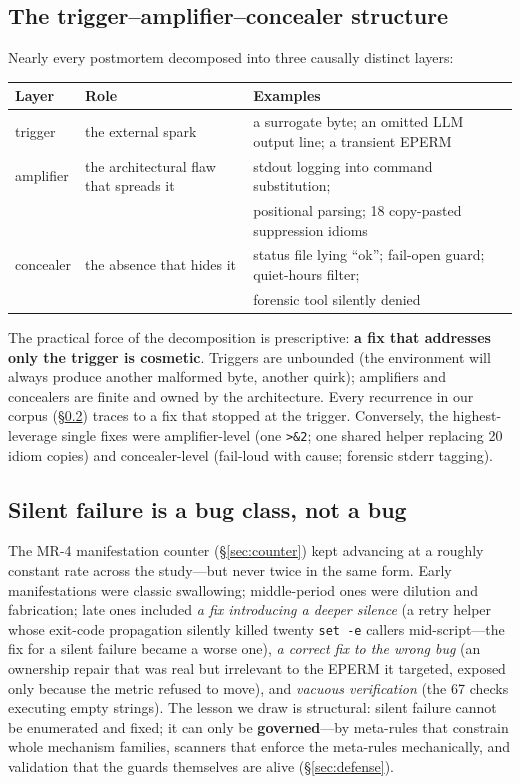 \subsection{The trigger--amplifier--concealer structure}\label{sec:tac}

Nearly every postmortem decomposed into three causally distinct layers:

\begin{center}\small
\begin{tabular}{@{}lll@{}}
\toprule
\textbf{Layer} & \textbf{Role} & \textbf{Examples} \\
\midrule
trigger & the external spark & a surrogate byte; an omitted LLM output
line; a transient EPERM \\
amplifier & the architectural flaw that spreads it & stdout logging into
command substitution; \\
& & positional parsing; 18 copy-pasted suppression idioms \\
concealer & the absence that hides it & status file lying ``ok'';
fail-open guard; quiet-hours filter; \\
& & forensic tool silently denied \\
\bottomrule
\end{tabular}
\end{center}

The practical force of the decomposition is prescriptive: \textbf{a fix
that addresses only the trigger is cosmetic}. Triggers are unbounded (the
environment will always produce another malformed byte, another quirk);
amplifiers and concealers are finite and owned by the architecture. Every
recurrence in our corpus (\S\ref{sec:bugclass}) traces to a fix that
stopped at the trigger. Conversely, the highest-leverage single fixes
were amplifier-level (one \texttt{>\&2}; one shared helper replacing 20
idiom copies) and concealer-level (fail-loud with cause; forensic stderr
tagging).

\subsection{Silent failure is a bug class, not a bug}\label{sec:bugclass}

The MR-4 manifestation counter (\S\ref{sec:counter}) kept advancing at a
roughly constant rate across the study---but never twice in the same
form. Early manifestations were classic swallowing; middle-period ones
were dilution and fabrication; late ones included \emph{a fix introducing
a deeper silence} (a retry helper whose exit-code propagation silently
killed twenty \texttt{set~-e} callers mid-script---the fix for a silent
failure became a worse one), \emph{a correct fix to the wrong bug} (an
ownership repair that was real but irrelevant to the EPERM it targeted,
exposed only because the metric refused to move), and \emph{vacuous
verification} (the 67 checks executing empty strings). The lesson we draw
is structural: silent failure cannot be enumerated and fixed; it can only
be \textbf{governed}---by meta-rules that constrain whole mechanism
families, scanners that enforce the meta-rules mechanically, and
validation that the guards themselves are alive (\S\ref{sec:defense}).

